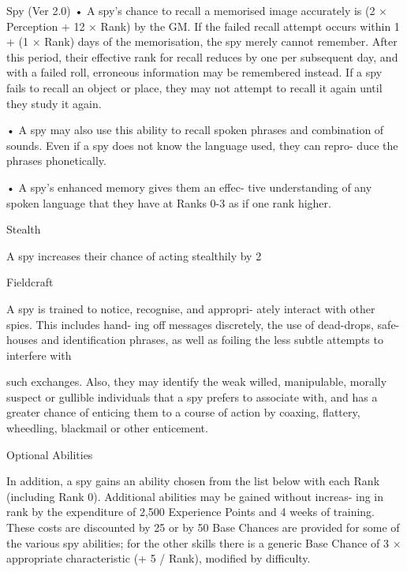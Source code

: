 \begin{Chapter}{Spy (Ver 2.0)}
•  A  spy’s  chance  to  recall  a  memorised  image 
accurately is (2 × Perception + 12 × Rank)%
by  the  GM.  If  the  failed  recall  attempt  occurs 
within  1  +  (1  ×  Rank)  days  of  the  memorisation, 
the spy merely cannot remember. After this period, 
their  effective  rank  for  recall  reduces  by  one  per 
subsequent  day,  and  with  a  failed  roll,  erroneous 
information  may  be  remembered  instead.  If  a  spy 
fails  to  recall  an  object  or  place,  they  may  not 
attempt to recall it again until they study it again.  

•  A  spy  may  also  use  this  ability  to  recall  spoken 
phrases  and  combination  of  sounds.  Even  if  a  spy 
does  not  know  the  language  used,  they  can  repro-
duce the phrases phonetically.  

•  A  spy’s  enhanced  memory  gives  them  an  effec-
tive  understanding  of  any  spoken  language  that 
they have at Ranks 0-3 as if one rank higher. 

Stealth 

A spy increases their chance of acting stealthily by 
2%

Fieldcraft 

A spy is trained to notice, recognise, and appropri-
ately interact with other spies. This includes hand-
ing off messages discretely, the use of dead-drops, 
safe-houses  and  identification  phrases,  as  well  as 
foiling  the  less  subtle  attempts  to  interfere  with 

such  exchanges.  Also,  they  may  identify  the  weak 
willed,  manipulable,  morally  suspect  or  gullible 
individuals that a spy prefers to associate with, and 
has a greater chance of enticing them to a course of 
action  by  coaxing,  flattery,  wheedling,  blackmail 
or other enticement. 

Optional Abilities 

In addition, a spy gains an ability chosen from the 
list  below  with  each  Rank  (including  Rank  0). 
Additional abilities may be gained without increas-
ing in rank by the expenditure of 2,500 Experience 
Points  and  4  weeks  of  training.  These  costs  are 
discounted  by  25%
or by 50%
Base Chances are provided for some of the various 
spy  abilities;  for  the  other  skills  there  is  a  generic 
Base Chance of 3 × appropriate characteristic (+ 5 / 
Rank), modified by difficulty. 


\end{Chapter}
